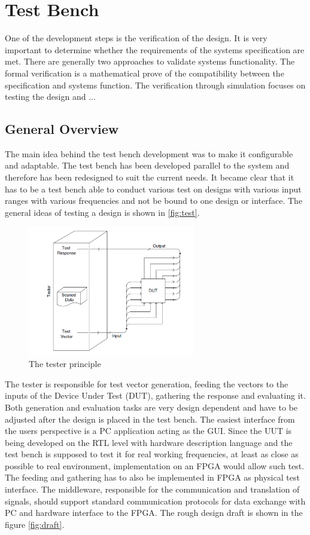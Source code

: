 \chapter{Test Bench}
One of the development steps is the verification of the design. It is very important to determine whether the requirements of the systems specification are met. There are generally two approaches to validate systems functionality. The formal verification is a mathematical prove of the compatibility between the specification and systems function. The verification through simulation focuses on testing the design and  ...

\section{General Overview}
The main idea behind the test bench development was to make it configurable and adaptable. The test bench has been developed parallel to the system and therefore has been redesigned to suit the current needs. It became clear that it has to be a test bench able to conduct various test on designs with various input ranges with various frequencies and not be bound to one design or interface. The general ideas of testing a design is shown in \autoref{fig:test}.

\begin{figure}[H]
\centering
\includegraphics[width=0.65\textwidth]{figures/test.png}
\caption{The tester principle~\cite{book:Navabi}}
\label{fig:test}
\end{figure}

The tester is responsible for test vector generation, feeding the vectors to the inputs of the Device Under Test (DUT), gathering the response and evaluating it. Both generation and evaluation tasks are very design dependent and have to be adjusted after the design is placed in the test bench. The easiest interface from the users perspective is a PC application acting as the GUI. Since the UUT is being developed on the RTL level with hardware description language and the test bench is supposed to test it for real working frequencies, at least as close as possible to real environment, implementation on an FPGA would allow such test. The feeding and gathering has to also be implemented in FPGA as physical test interface. The middleware, responsible for the communication and translation of signals, should support standard communication protocols for data exchange with PC and hardware interface to the FPGA. The rough design draft is shown in the figure \autoref{fig:draft}.\\
 

